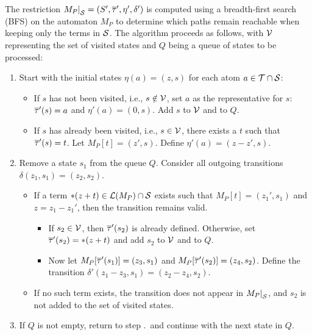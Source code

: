 The restriction $\restr{M_P}{\Set} = (S', \otau', \eta', \delta')$ is computed using a breadth-first search (BFS) on the automaton $M_P$ to determine which paths remain reachable when keeping only the terms in $\mathcal{S}$.
The algorithm proceeds as follows, with $\mathcal{V}$ representing the set of visited states and $Q$ being a queue of states to be processed:

\begin{enumerate}
    \item Start with the initial states $\eta(a) = (z, s)$ for each atom $a \in \mathcal{T} \cap \mathcal{S}$:
          \begin{itemize}
              \item If $s$ has not been visited, i.e., $s \notin \mathcal{V}$, set $a$ as the representative for $s$:
                    $\overline{\tau}'(s) = a$ and $\eta'(a) = (0, s)$.
                    Add $s$ to $\mathcal{V}$ and to $Q$.
              \item If $s$ has already been visited, i.e., $s \in \mathcal{V}$, there exists a $t$ such that $\overline{\tau}'(s) = t$.
                    Let $M_P[t] = (z', s)$.
                    Define $\eta'(a) = (z - z', s)$.
          \end{itemize}

          \item\label{item:remove-from-Q} Remove a state $s_1$ from the queue $Q$.
          Consider all outgoing transitions $\delta(z_1, s_1) = (z_2, s_2)$.
          \begin{itemize}
              \item If a term $*(z+t) \in \mathcal{L}(M_P) \cap \mathcal{S}$ exists such that $M_P[t] = (z_1', s_1)$ and $z = z_1 - z_1'$,
                    then the transition remains valid.
                    \begin{itemize}
                        \item If $s_2 \in \mathcal{V}$, then $\overline{\tau}'(s_2)$ is already defined.
                              Otherwise, set $\overline{\tau}'(s_2) = *(z+t)$ and add $s_2$ to $\mathcal{V}$ and to $Q$.
                        \item Now let $M_P[\overline{\tau}'(s_1)] = (z_3, s_1)$ and $M_P[\overline{\tau}'(s_2)] = (z_4, s_2)$.
                              Define the transition $\delta'(z_1 - z_3, s_1) = (z_2 - z_4, s_2)$.
                    \end{itemize}
              \item If no such term exists, the transition does not appear in $\restr{M_P}{\Set}$, and $s_2$ is not added to the set of visited states.
          \end{itemize}
    \item If $Q$ is not empty, return to step .\ and continue with the next state in $Q$.
\end{enumerate}

